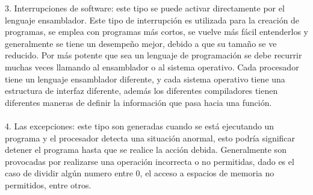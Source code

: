 \documentclass{article}
\begin{document}
3. Interrupciones de software: este tipo se puede activar directamente por el lenguaje ensamblador. Este tipo de interrupción es utilizada para la creación de programas, se emplea con programas más cortos, se vuelve más fácil entenderlos y generalmente se tiene un desempeño mejor, debido a que su tamaño se ve reducido. Por más potente que sea un lenguaje de programación se debe recurrir muchas veces llamando al ensamblador o al sistema operativo. Cada procesador tiene un lenguaje ensamblador diferente, y cada sistema operativo tiene una estructura de interfaz diferente, además los diferentes compiladores tienen diferentes maneras de definir la información que pasa hacia una función.\citep{4}\\\\
4. Las excepciones: este tipo son generadas cuando se está ejecutando un programa y el procesador detecta una situación anormal, esto podría significar detener el programa hasta que se realice la acción debida. Generalmente son provocadas por realizarse una operación incorrecta o no permitidas, dado es el caso de dividir algún numero entre 0, el acceso a espacios de memoria no permitidos, entre otros.\citep{3}\citep{5}\\



\end{document}
